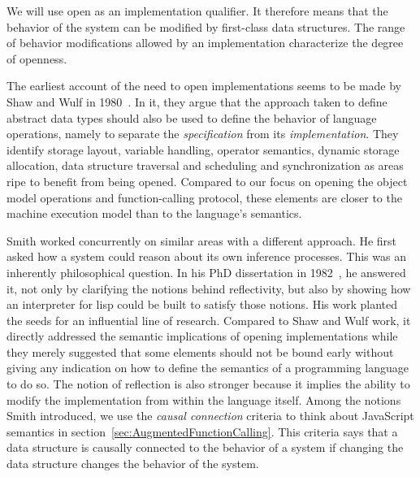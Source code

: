 We will use open as an implementation qualifier. It therefore means that
the behavior of the system can be modified by first-class data structures. The
range of behavior modifications allowed by an implementation characterize the
degree of openness.

The earliest account of the need to open implementations seems to be made by
Shaw and Wulf in 1980~\cite{Shaw:1980}. In it, they argue that the approach
taken to define abstract data types should also be used to define the behavior
of language operations, namely to separate the \textit{specification} from its
\textit{implementation}. They identify storage layout, variable handling,
operator semantics, dynamic storage allocation, data structure traversal and
scheduling and synchronization as areas ripe to benefit from being opened.
Compared to our focus on opening the object model operations and
function-calling protocol, these elements are closer to the machine execution
model than to the language's semantics. 

Smith worked concurrently on similar areas with a different approach. He
first asked how a system could reason about its own inference processes. This
was an inherently philosophical question. In his PhD dissertation in
1982~\cite{Smith:1982}, he answered it, not only by clarifying the notions
behind reflectivity, but also by showing how an interpreter for lisp could be
built to satisfy those notions. His work planted the seeds for an influential
line of research. Compared to Shaw and Wulf work, it directly addressed the
semantic implications of opening implementations while they merely suggested
that some elements should not be bound early without giving any indication on
how to define the semantics of a programming language to do so.  The notion of
reflection is also stronger because it implies the ability to modify the
implementation from within the language itself. Among the notions Smith
introduced, we use the \textit{causal connection} criteria to think about
JavaScript semantics in section~\ref{sec:AugmentedFunctionCalling}. This
criteria says that a data structure is causally connected to the behavior of a
system if changing the data structure changes the behavior of the system.


